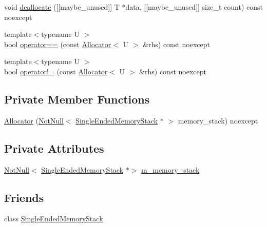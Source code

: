 \begin{DoxyCompactItemize}
void \mbox{\hyperlink{classmage_1_1_single_ended_memory_stack_1_1_allocator_a4939b197939091bce4e6df3b757bf495}{deallocate}} (\mbox{[}\mbox{[}maybe\+\_\+unused\mbox{]}\mbox{]} T $\ast$data, \mbox{[}\mbox{[}maybe\+\_\+unused\mbox{]}\mbox{]} size\+\_\+t count) const noexcept
\item 
{\footnotesize template$<$typename U $>$ }\\bool \mbox{\hyperlink{classmage_1_1_single_ended_memory_stack_1_1_allocator_ac59d13195925c0b0bf536edd501708b8}{operator==}} (const \mbox{\hyperlink{classmage_1_1_single_ended_memory_stack_1_1_allocator}{Allocator}}$<$ U $>$ \&rhs) const noexcept
\item 
{\footnotesize template$<$typename U $>$ }\\bool \mbox{\hyperlink{classmage_1_1_single_ended_memory_stack_1_1_allocator_a57c563e2632a28328df5588559047df6}{operator!=}} (const \mbox{\hyperlink{classmage_1_1_single_ended_memory_stack_1_1_allocator}{Allocator}}$<$ U $>$ \&rhs) const noexcept
\end{DoxyCompactItemize}
\subsection*{Private Member Functions}
\begin{DoxyCompactItemize}
\item 
\mbox{\hyperlink{classmage_1_1_single_ended_memory_stack_1_1_allocator_a8c82486b5fa67f596738805aa73559d9}{Allocator}} (\mbox{\hyperlink{namespacemage_a8769f9d670d6b585ea306cb1062af94b}{Not\+Null}}$<$ \mbox{\hyperlink{classmage_1_1_single_ended_memory_stack}{Single\+Ended\+Memory\+Stack}} $\ast$ $>$ memory\+\_\+stack) noexcept
\end{DoxyCompactItemize}
\subsection*{Private Attributes}
\begin{DoxyCompactItemize}
\item 
\mbox{\hyperlink{namespacemage_a8769f9d670d6b585ea306cb1062af94b}{Not\+Null}}$<$ \mbox{\hyperlink{classmage_1_1_single_ended_memory_stack}{Single\+Ended\+Memory\+Stack}} $\ast$$>$ \mbox{\hyperlink{classmage_1_1_single_ended_memory_stack_1_1_allocator_a8728466cdbe936716f4326f298a6f186}{m\+\_\+memory\+\_\+stack}}
\end{DoxyCompactItemize}
\subsection*{Friends}
\begin{DoxyCompactItemize}
\item 
class \mbox{\hyperlink{classmage_1_1_single_ended_memory_stack_1_1_allocator_a3f3449e5c2caa1666a293b36db6f5a54}{Single\+Ended\+Memory\+Stack}}
\end{DoxyCompactItemize}


